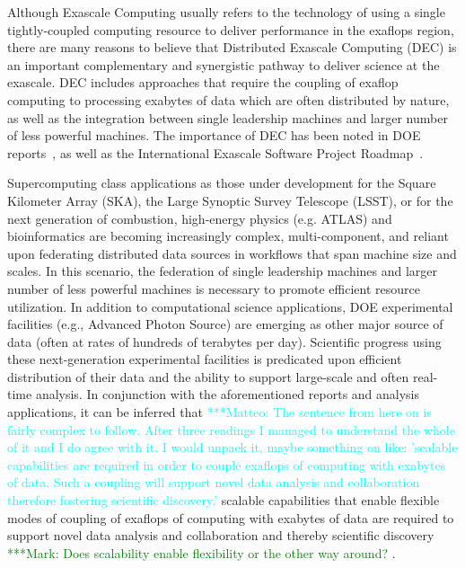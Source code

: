 \documentclass[11pt,final]{article}
\newcommand{\msnote}[1]{ {\textcolor{green} { ***Mark: #1 }}}
\newcommand{\mtnote}[1]{ {\textcolor{cyan} { ***Matteo: #1 }}}
\newcommand{\msnote}[1]{}
\newcommand{\mtnote}[1]{}
\begin{document}
{
Although Exascale Computing usually refers to the technology of using
a single tightly-coupled computing resource to deliver performance in
the exaflops region, there are many reasons to believe that
Distributed Exascale Computing (DEC) is an important complementary and
synergistic pathway to deliver science at the exascale.  DEC includes
approaches that require the coupling of exaflop computing to
processing exabytes of data which are often distributed by nature, as well as
the integration between single leadership machines and larger number
of less powerful machines. The importance of DEC has been noted in DOE
reports~\cite{dmav-exa}, as well as the International Exascale
Software Project Roadmap~\cite{iespr}.


Supercomputing class applications as those under development for the Square
Kilometer Array (SKA), the Large Synoptic Survey Telescope (LSST), or for the
next generation of combustion, high-energy physics (e.g. ATLAS) and
bioinformatics are becoming increasingly complex, multi-component, and reliant
upon federating distributed data sources in workflows that span machine size
and scales.  In this scenario, the federation of single leadership machines and
larger number of less powerful machines is necessary to promote efficient
resource utilization.  In addition to computational science applications, DOE
experimental facilities (e.g., Advanced Photon Source) are emerging as other
major source of data (often at rates of hundreds of terabytes per day).
Scientific progress using these next-generation experimental facilities is
predicated upon efficient distribution of their data and the ability to support
large-scale and often real-time analysis.  In conjunction with the
aforementioned reports and analysis %
applications, it can be inferred that \mtnote{The sentence from here on is
fairly complex to follow. After three readings I managed to understand the
whole of it and I do agree with it. I would unpack it, maybe something on like:
'scalable capabilities are required in order to couple exaflops of computing
with exabytes of data. Such a coupling will support novel data analysis and
collaboration therefore fostering scientific discovery.'} scalable capabilities
that enable flexible modes of coupling of exaflops of computing with exabytes
of data are required to support novel data analysis and collaboration and
thereby scientific discovery\msnote{Does scalability enable flexibility or the
other way around?}.

}
\end{document}
